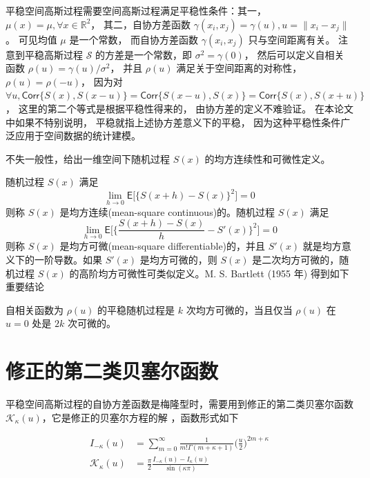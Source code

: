 \documentclass[12pt,a4paper,UTF8,twoside]{book}
\theoremstyle{definition}
\theoremstyle{definition}
\theoremstyle{definition}
\theoremstyle{remark}
\let\BeginKnitrBlock\begin \let\EndKnitrBlock\end
\begin{document}
平稳空间高斯过程需要空间高斯过程满足平稳性条件：其一，
\(\mu(x) = \mu, \forall x \in \mathbb{R}^2\)， 其二，自协方差函数
\(\gamma(x_i,x_j) = \gamma(u),u=\|x_{i} - x_{j}\|\)。 可见均值 \(\mu\)
是一个常数， 而自协方差函数 \(\gamma(x_i,x_j)\) 只与空间距离有关。
注意到平稳高斯过程 \(\mathcal{S}\) 的方差是一个常数，即
\(\sigma^2 = \gamma(0)\)， 然后可以定义自相关函数
\(\rho(u) = \gamma(u)/\sigma^2\)， 并且 \(\rho(u)\)
满足关于空间距离的对称性， \(\rho(u) = \rho(-u)\)， 因为对
\(\forall u, \mathsf{Corr}\{S(x),S(x-u)\} = \mathsf{Corr}\{S(x-u), S(x)\} = \mathsf{Corr}\{S(x),S(x+u)\}\)，
这里的第二个等式是根据平稳性得来的， 由协方差的定义不难验证。
在本论文中如果不特别说明， 平稳就指上述协方差意义下的平稳，
因为这种平稳性条件广泛应用于空间数据的统计建模。

不失一般性，给出一维空间下随机过程 \(S(x)\) 的均方连续性和可微性定义。

\BeginKnitrBlock{definition}[连续性和可微性]
\protect\hypertarget{def:continuous-differentiable}{}{\label{def:continuous-differentiable}
{} }随机过程 \(S(x)\) 满足
\[ \lim_{h \to 0} \mathsf{E}\big[ \{S(x + h) - S(x)\}^{2} \big] = 0 \]
\noindent 则称 \(S(x)\) 是均方连续(mean-square continuous)的。随机过程
\(S(x)\) 满足
\[ \lim_{h \to 0} \mathsf{E} \big[ \{ \frac{S(x+h) - S(x)}{h} - S'(x) \}^2 \big] = 0 \]
\noindent 则称 \(S(x)\) 是均方可微(mean-square differentiable)的，并且
\(S'(x)\) 就是均方意义下的一阶导数。如果 \(S'(x)\) 是均方可微的，则
\(S(x)\) 是二次均方可微的，随机过程 \(S(x)\)
的高阶均方可微性可类似定义。M. S. Bartlett (1955 年)
\citep{Bartlett1955} 得到如下重要结论
\EndKnitrBlock{definition}

\BeginKnitrBlock{theorem}[平稳随机过程的可微性]
\protect\hypertarget{thm:stationary-mean-square-properties}{}{\label{thm:stationary-mean-square-properties}
{} }自相关函数为 \(\rho(u)\)
的平稳随机过程是 \(k\) 次均方可微的，当且仅当 \(\rho(u)\) 在 \(u = 0\)
处是 \(2k\) 次可微的。
\EndKnitrBlock{theorem}

\hypertarget{sec:modified-bessel-function}{%
\section{修正的第二类贝塞尔函数}\label{sec:modified-bessel-function}}

平稳空间高斯过程的自协方差函数是梅隆型时，需要用到修正的第二类贝塞尔函数
\(\mathcal{K}_{\kappa}(u)\)，它是修正的贝塞尔方程的解
\citep{Abramowitz1972}，函数形式如下

\begin{equation}
\begin{aligned}
I_{-\kappa}(u) & =  \sum_{m=0}^{\infty} \frac{1}{m!\Gamma(m + \kappa + 1)} \big(\frac{u}{2}\big)^{2m + \kappa} \\
\mathcal{K}_{\kappa}(u) & = \frac{\pi}{2} \frac{I_{-\kappa}(u) - I_{\kappa}(u)}{\sin (\kappa \pi)}
\end{aligned} \label{eq:besselK-function}
\end{equation}
\end{document}
